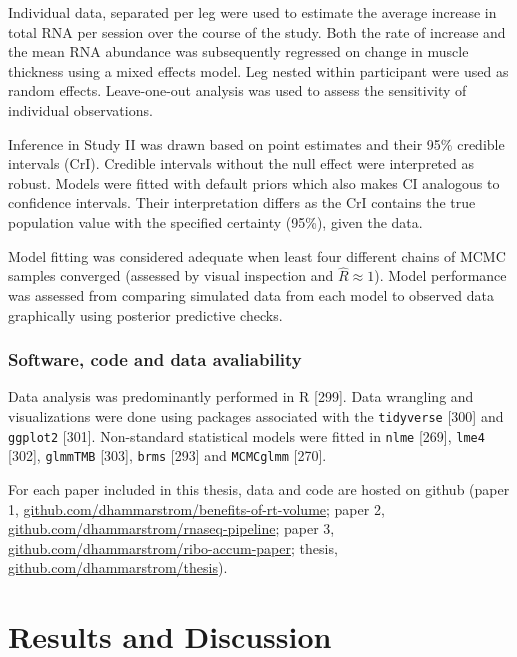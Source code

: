 \documentclass[twoside,10pt]{gihclass} %
\begin{document}
Individual data, separated per leg were used to estimate the average increase in total RNA per session over the course of the study. Both the rate of increase and the mean RNA abundance was subsequently regressed on change in muscle thickness using a mixed effects model. Leg nested within participant were used as random effects. Leave-one-out analysis was used to assess the sensitivity of individual observations.

Inference in Study II was drawn based on point estimates and their 95\% credible intervals (CrI). Credible intervals without the null effect were interpreted as robust. Models were fitted with default priors which also makes CI analogous to confidence intervals. Their interpretation differs as the CrI contains the true population value with the specified certainty (95\%), given the data.

Model fitting was considered adequate when least four different chains of MCMC samples converged (assessed by visual inspection and \(\hat{R}\approx 1\)). Model performance was assessed from comparing simulated data from each model to observed data graphically using posterior predictive checks.

\hypertarget{software-code-and-data-avaliability}{%
\subsection{Software, code and data avaliability}\label{software-code-and-data-avaliability}}

Data analysis was predominantly performed in R {[}299{]}.
Data wrangling and visualizations were done using packages associated with the
\texttt{tidyverse} {[}300{]} and \texttt{ggplot2} {[}301{]}.
Non-standard statistical models were fitted in
\texttt{nlme} {[}269{]},
\texttt{lme4} {[}302{]},
\texttt{glmmTMB} {[}303{]},
\texttt{brms} {[}293{]} and
\texttt{MCMCglmm} {[}270{]}.

For each paper included in this thesis, data and code are hosted on github (paper 1, \href{https://github.com/dhammarstrom/benefits-of-rt-volume}{github.com/dhammarstrom/benefits-of-rt-volume}; paper 2, \href{https://github.com/dhammarstrom/rnaseq-pipeline}{github.com/dhammarstrom/rnaseq-pipeline};
paper 3, \href{https://github.com/dhammarstrom/ribo-accum-paper}{github.com/dhammarstrom/ribo-accum-paper};
thesis, \href{https://github.com/dhammarstrom/thesis}{github.com/dhammarstrom/thesis}).

\hypertarget{results-and-discussion}{%
\chapter{Results and Discussion}\label{results-and-discussion}}
\end{document}
